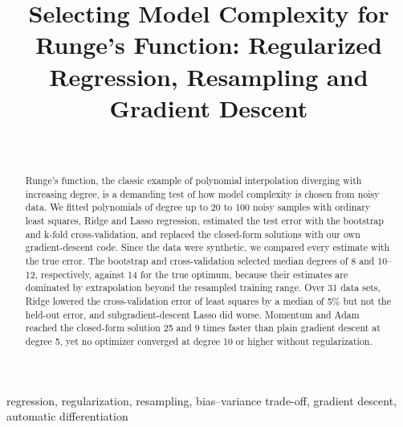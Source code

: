 \documentclass[a4paper]{IEEEtran}
\begin{document}
\title{
    Selecting Model Complexity for Runge's Function:
    Regularized Regression, Resampling and Gradient Descent
}

\author{
    \\
}

\maketitle

\begin{abstract}
Runge's function, the classic example of polynomial interpolation diverging
with increasing degree, is a demanding test of how model complexity is
chosen from noisy data. We fitted polynomials of degree up to 20
to 100 noisy samples with ordinary least squares, Ridge and Lasso regression,
estimated the test error with the bootstrap and k-fold cross-validation, and
replaced the closed-form solutions with our own gradient-descent code.
Since the data were synthetic, we compared every estimate
with the true error. The bootstrap and cross-validation selected
median degrees of 8 and 10--12, respectively, against 14 for the true
optimum, because their
estimates are dominated by extrapolation beyond the resampled training range.
Over 31 data sets, Ridge lowered the cross-validation error of least squares by
a median of 5\% but not the held-out error, and subgradient-descent Lasso did
worse. Momentum and Adam reached the closed-form solution 25
and 9 times faster than plain gradient descent at degree 5, yet no optimizer
converged at degree 10 or higher without regularization.
\end{abstract}

\begin{IEEEkeywords}
regression, regularization, resampling, bias--variance trade-off,
gradient descent, automatic differentiation
\end{IEEEkeywords}








\printbibliography

\appendix





\end{document}
